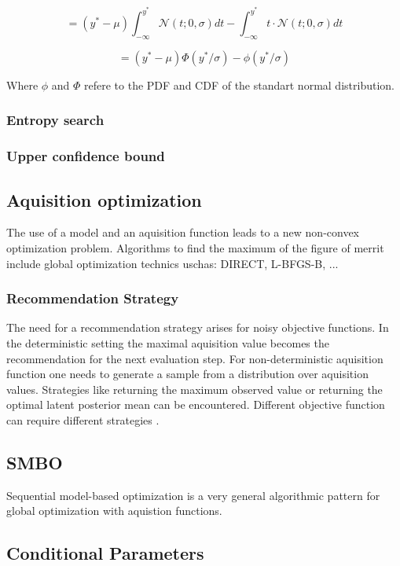 \documentclass[english]{article}
\newcommand{\normal}{\mathcal{N}}
\begin{document}
$$ = (y^*-\mu)\int_{-\infty}^{y^*}\normal(t; 0, \sigma)dt - \int_{-\infty}^{y^*}t\cdot\normal(t; 0, \sigma)dt$$

$$ = (y^*-\mu)\Phi(y^*/\sigma) - \phi(y^*/\sigma) $$

Where $\phi$ and $\Phi$ refere to the PDF and CDF of the standart normal distribution.

\subsubsection{Entropy search}
\subsubsection{Upper confidence bound}

\subsection{Aquisition optimization}
The use of a model and an aquisition function leads to a new non-convex optimization problem. Algorithms to find the maximum of the figure of merrit include global optimization technics uschas: DIRECT, L-BFGS-B, ...

\subsubsection{Recommendation Strategy}
The need for a recommendation strategy arises for noisy objective functions. In the deterministic setting the maximal aquisition value becomes the recommendation for the next evaluation step. For non-deterministic aquisition function one needs to generate a sample from a distribution over aquisition values. Strategies like returning the maximum observed value or returning the optimal latent posterior mean can be encountered. Different objective function can require different strategies \cite{hoffman_modular_2014}.

\subsection{SMBO}
Sequential model-based optimization is a very general algorithmic pattern for global optimization with aquistion functions.


\subsection{Conditional Parameters}
\end{document}

